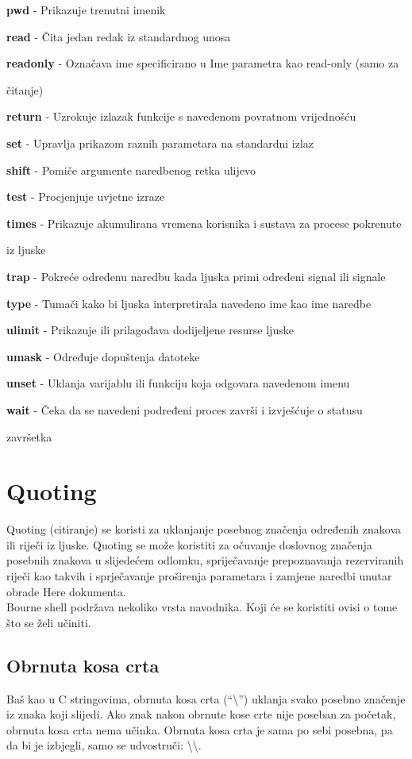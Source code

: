 \documentclass[11pt]{book}
\begin{document}
\textbf{pwd} - Prikazuje trenutni imenik

\textbf{read} - Čita jedan redak iz standardnog unosa

\textbf{readonly} - Označava ime specificirano u Ime parametra kao read-only (samo za

čitanje)

\textbf{return} - Uzrokuje izlazak funkcije s navedenom povratnom vrijednošću

\textbf{set} - Upravlja prikazom raznih parametara na standardni izlaz

\textbf{shift} - Pomiče argumente naredbenog retka ulijevo

\textbf{test} - Procjenjuje uvjetne izraze

\textbf{times} - Prikazuje akumulirana vremena korisnika i sustava za procese pokrenute

iz ljuske

\textbf{trap} - Pokreće određenu naredbu kada ljuska primi određeni signal ili signale

\textbf{type} - Tumači kako bi ljuska interpretirala navedeno ime kao ime naredbe

\textbf{ulimit} - Prikazuje ili prilagođava dodijeljene resurse ljuske

\textbf{umask} - Određuje dopuštenja datoteke

\textbf{unset} - Uklanja varijablu ili funkciju koja odgovara navedenom imenu

\textbf{wait} - Čeka da se navedeni podređeni proces završi i izvješćuje o statusu

završetka

\section{Quoting}
Quoting (citiranje) se koristi za uklanjanje posebnog značenja određenih znakova ili riječi iz ljuske. Quoting se može koristiti za očuvanje doslovnog značenja posebnih znakova u slijedećem odlomku, spriječavanje prepoznavanja rezerviranih riječi kao takvih i sprječavanje proširenja parametara i zamjene naredbi unutar obrade Here dokumenta.\\ 
Bourne shell podržava nekoliko vrsta navodnika. Koji će se koristiti ovisi o tome što se želi učiniti.

\subsection{Obrnuta kosa crta}
Baš kao u C stringovima, obrnuta kosa crta (``\textbackslash'') uklanja svako posebno značenje iz znaka koji slijedi. Ako znak nakon obrnute kose crte nije poseban za početak, obrnuta kosa crta nema učinka. Obrnuta kosa crta je sama po sebi posebna, pa da bi je izbjegli, samo se udvostruči: \textbackslash\textbackslash. 
\end{document}
